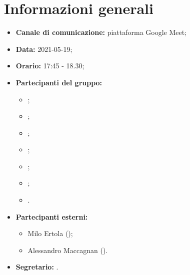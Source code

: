 \section{Informazioni generali}
\begin{itemize}
\item \textbf{Canale di comunicazione:} piattaforma Google Meet;
\item \textbf{Data:} 2021-05-19;
\item \textbf{Orario:} 17:45 - 18.30;
\item \textbf{Partecipanti del gruppo:}
	\begin{itemize}
	\item \MDI ;
	\item \MB ;
	\item \GB ;
	\item \VAS ;
	\item \FD ;
	\item \NM ;
	\item \SB .
	\end{itemize}
\item \textbf{Partecipanti esterni:}
	\begin{itemize}
	\item Milo Ertola (\Proponente);
	\item Alessandro Maccagnan (\Proponente).
	\end{itemize}
\item \textbf{Segretario:} \VAS .

\end{itemize}